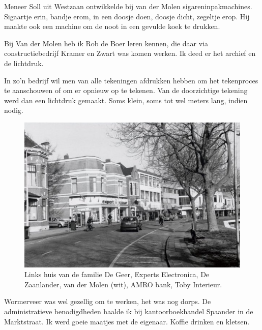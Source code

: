 \documentclass[12pt,twoside, openright]{memoir}
\begin{document}
Meneer Soll uit Westzaan ontwikkelde bij van der Molen  sigareninpakmachines. Sigaartje erin, bandje erom, in een doosje doen, doosje dicht, zegeltje erop. Hij maakte ook een machine om de noot in een gevulde koek te drukken. 

Bij Van der Molen heb ik Rob de Boer leren kennen, die daar via constructiebedrijf Kramer en Zwart was komen werken. Ik deed er het archief en de lichtdruk. 

In zo'n bedrijf wil men van alle tekeningen afdrukken hebben om het tekenproces te aanschouwen of om er opnieuw op te tekenen. Van de doorzichtige tekening werd dan een lichtdruk gemaakt. Soms klein, soms tot wel meters lang, indien nodig. 

\begin{figure}
\centering
\includegraphics[width=\textwidth]{img/240zaanweg}
\caption*{\footnotesize Links huis van de familie De Geer, Experts Electronica, De Zaanlander, van der Molen (wit), AMRO bank, Toby Interieur.}
\end{figure}

Wormerveer was wel gezellig om te werken, het was nog dorps. De administratieve benodigdheden haalde ik bij kantoorboekhandel Spaander in de Marktstraat. Ik werd goeie maatjes met de eigenaar. Koffie drinken en kletsen. 
\end{document}
